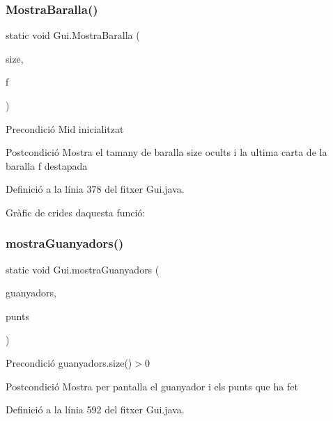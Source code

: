 \subsubsection{\texorpdfstring{Mostra\+Baralla()}{MostraBaralla()}}
{\footnotesize\ttfamily static void Gui.\+Mostra\+Baralla (\begin{DoxyParamCaption}\item[{int}]{size,  }\item[{\mbox{\hyperlink{class_fitxa}{Fitxa}}}]{f }\end{DoxyParamCaption})\hspace{0.3cm}{\ttfamily [static]}}

\begin{DoxyPrecond}{Precondició}
Mid inicialitzat 
\end{DoxyPrecond}
\begin{DoxyPostcond}{Postcondició}
Mostra el tamany de baralla size ocults i la ultima carta de la baralla f destapada 
\end{DoxyPostcond}


Definició a la línia 378 del fitxer Gui.\+java.

Gràfic de crides d\textquotesingle{}aquesta funció\+:
\mbox{\label{class_gui_a561f8d0d185d5dcb133ea83385380d6c}} 
\subsubsection{\texorpdfstring{mostra\+Guanyadors()}{mostraGuanyadors()}}
{\footnotesize\ttfamily static void Gui.\+mostra\+Guanyadors (\begin{DoxyParamCaption}\item[{Array\+List$<$ Integer $>$}]{guanyadors,  }\item[{int}]{punts }\end{DoxyParamCaption})\hspace{0.3cm}{\ttfamily [static]}}

\begin{DoxyPrecond}{Precondició}
guanyadors.\+size()$>$0 
\end{DoxyPrecond}
\begin{DoxyPostcond}{Postcondició}
Mostra per pantalla el guanyador i els punts que ha fet 
\end{DoxyPostcond}


Definició a la línia 592 del fitxer Gui.\+java.

